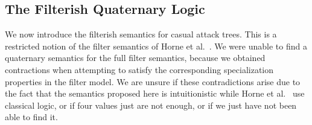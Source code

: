 \documentclass{llncs}
\begin{document}

\subsection{The Filterish Quaternary Logic}
\label{subsec:the_filterish_quaternary_semantics}
We now introduce the filterish semantics for casual attack trees.
This is a restricted notion of the filter semantics of Horne et
al.~\cite{horne2017semantics}.  We were unable to find a quaternary
semantics for the full filter semantics, because we obtained
contractions when attempting to satisfy the corresponding
specialization properties in the filter model.  We are unsure if these
contradictions arise due to the fact that the semantics proposed here
is intuitionistic while Horne et al.~\cite{horne2017semantics} use
classical logic, or if four values just are not enough, or if we just
have not been able to find it.
\end{document}

